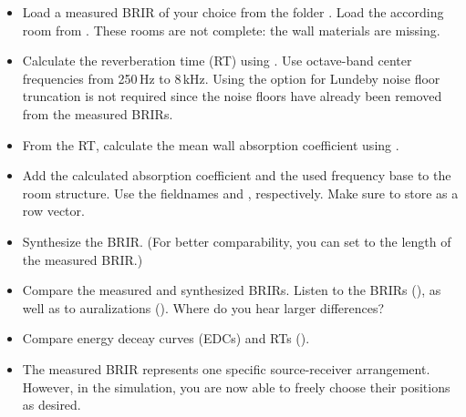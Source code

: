\documentclass[a4paper, fleqn, 11pt]{article}
\begin{document}
\begin{itemize}
  \item Load a measured BRIR of your choice from the folder . Load the according room from . These rooms are not complete: the wall materials are missing.
  \item Calculate the reverberation time (RT) using . Use octave-band center frequencies from 250\,Hz to 8\,kHz. Using the option for Lundeby noise floor truncation is not required since the noise floors have already been removed from the measured BRIRs.
  \item From the RT, calculate the mean wall absorption coefficient using .
  \item Add the calculated absorption coefficient and the used frequency base to the room structure. Use the fieldnames  and , respectively. Make sure to store  as a row vector.
  \item Synthesize the BRIR. (For better comparability, you can set  to the length of the measured BRIR.)
  \item Compare the measured and synthesized BRIRs. Listen to the BRIRs (), as well as to auralizations (). Where do you hear larger differences?
  \item Compare energy deceay curves (EDCs) and RTs ().
  \item The measured BRIR represents one specific source-receiver arrangement. However, in the simulation, you are now able to freely choose their positions as desired.
\end{itemize}

\end{document}
